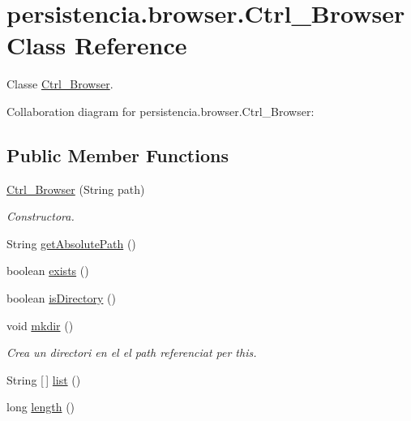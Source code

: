 \hypertarget{classpersistencia_1_1browser_1_1Ctrl__Browser}{}\section{persistencia.\+browser.\+Ctrl\+\_\+\+Browser Class Reference}
\label{classpersistencia_1_1browser_1_1Ctrl__Browser}


Classe \hyperlink{classpersistencia_1_1browser_1_1Ctrl__Browser}{Ctrl\+\_\+\+Browser}.  




Collaboration diagram for persistencia.\+browser.\+Ctrl\+\_\+\+Browser\+:
\subsection*{Public Member Functions}
\begin{DoxyCompactItemize}
\item 
\hyperlink{classpersistencia_1_1browser_1_1Ctrl__Browser_a6cd8687a9748fc4c169d1d72be7081b1}{Ctrl\+\_\+\+Browser} (String path)
\begin{DoxyCompactList}\small\item\em Constructora. \end{DoxyCompactList}\item 
String \hyperlink{classpersistencia_1_1browser_1_1Ctrl__Browser_abdabfef6639c93ac5dc64f569b5b1d36}{get\+Absolute\+Path} ()
\item 
boolean \hyperlink{classpersistencia_1_1browser_1_1Ctrl__Browser_ac79782a4f7fd5207498fe37e952f9b8b}{exists} ()
\item 
boolean \hyperlink{classpersistencia_1_1browser_1_1Ctrl__Browser_abdf13ea9a8d928b1efc6f3a69e18f6c6}{is\+Directory} ()
\item 
void \hyperlink{classpersistencia_1_1browser_1_1Ctrl__Browser_a947773ee38a780bae338aa0e4f396f6f}{mkdir} ()
\begin{DoxyCompactList}\small\item\em Crea un directori en el el path referenciat per this. \end{DoxyCompactList}\item 
String \mbox{[}$\,$\mbox{]} \hyperlink{classpersistencia_1_1browser_1_1Ctrl__Browser_abbf52c645a931fb8e5f727c2c99af97a}{list} ()
\item 
long \hyperlink{classpersistencia_1_1browser_1_1Ctrl__Browser_a22b50558c4e066fe0e486def502bd30d}{length} ()
\end{DoxyCompactItemize}
